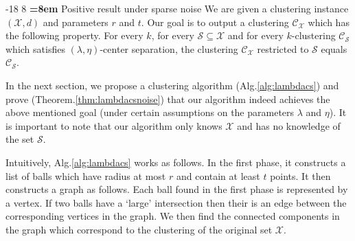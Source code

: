 \documentclass[orivec]{llncs}
\makeatletter
\newcommand{\mc}{\mathcal}
\renewcommand\subsubsection{\@startsection{subsubsection}{3}{\z@}%
   {-18\p@ \@plus -4\p@ \@minus -4\p@}%
   {8\p@ \@plus 4\p@ \@minus 4\p@}%
   {\normalfont\normalsize\bfseries\boldmath
   \rightskip=\z@ \@plus 8em \pretolerance=10000}}
\makeatother
\begin{document}
\subsubsection{Positive result under sparse noise}
\label{section:lambdaPositiveResultSparseNoise}
We are given a clustering instance $(\mc X, d)$ and parameters $r$ and $t$. Our goal is to output a clustering $\mc C_{\mc X}$ which has the following property. For every $k$, for every $\mc S \subseteq \mc X$ and for every $k$-clustering $\mc C_{\mc S}$ which satisfies $(\lambda, \eta)$-center separation, the clustering $\mc C_{\mc X}$ restricted to $\mc S$ equals $\mc C_{\mc S}$. 

In the next section, we propose a clustering algorithm (Alg.\ref{alg:lambdacs}) and prove (Theorem.\ref{thm:lambdacsnoise}) that our algorithm indeed achieves the above mentioned goal (under certain assumptions on the parameters $\lambda$ and $\eta$). It is important to note that our algorithm only knows $\mc X$ and has no knowledge of the set $\mc S$. 

Intuitively, Alg.\ref{alg:lambdacs} works as follows. In the first phase, it constructs a list of balls which have radius at most $r$ and contain at least $t$ points. It then constructs a graph as follows. Each ball found in the first phase is represented by a vertex. If two balls have a `large' intersection then their is an edge between the corresponding vertices in the graph. We then find the connected components in the graph which correspond to the clustering of the original set $\mc X$. 
\end{document}
